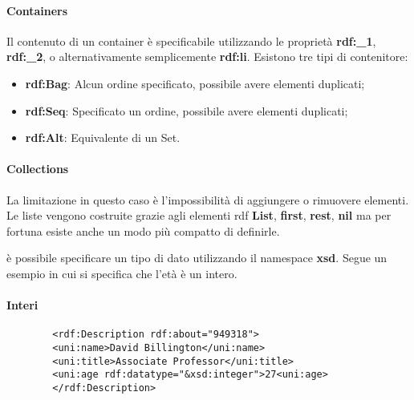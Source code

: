 \paragraph{Containers}
Il contenuto di un container è specificabile utilizzando le proprietà \textbf{rdf:\_1}, \textbf{rdf:\_2}, o alternativamente semplicemente \textbf{rdf:li}. Esistono tre tipi di contenitore:
\begin{itemize}
	\item \textbf{rdf:Bag}: Alcun ordine specificato, possibile avere elementi duplicati;
	\item \textbf{rdf:Seq}: Specificato un ordine, possibile avere elementi duplicati;
	\item \textbf{rdf:Alt}: Equivalente di un Set.
\end{itemize}
\paragraph{Collections}
La limitazione in questo caso è l'impossibilità di aggiungere o rimuovere elementi. Le liste vengono costruite grazie agli elementi rdf \textbf{List}, \textbf{first}, \textbf{rest}, \textbf{nil} ma per fortuna esiste anche un modo più compatto di definirle.

è possibile specificare un tipo di dato utilizzando il namespace \textbf{xsd}. Segue un esempio in cui si specifica che l'età è un intero.
\paragraph{Interi}
\begin{info}[Esempio]
	\begin{verbatim}
		<rdf:Description rdf:about="949318">
		<uni:name>David Billington</uni:name>
		<uni:title>Associate Professor</uni:title>
		<uni:age rdf:datatype="&xsd:integer">27<uni:age>
		</rdf:Description>
	\end{verbatim}
\end{info}
